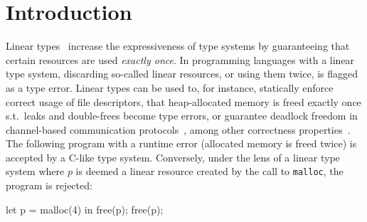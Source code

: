 \documentclass[acmsmall,review,screen]{acmart}
\newcommand{\ROUNDTWO}[1]{{\color{red}#1}}
\begin{document}
\section{Introduction}\label{sec:intro}


Linear types~\cite{cite:linear-logic,cite:barberdill} increase the
expressiveness of type systems by \ROUNDTWO{guaranteeing that certain
resources} are used \emph{exactly once}.
%
In programming languages with a linear type system, \ROUNDTWO{discarding so-called linear} resources,
or using them twice, is flagged as a type error. Linear types can \ROUNDTWO{be used to}, for instance,
statically enforce correct usage of file descriptors, that heap-allocated
memory is freed exactly once \ROUNDTWO{s.t.}~leaks and double-frees become type errors,
or guarantee deadlock freedom in channel-based communication protocols~\cite{10.1007/978-3-642-15375-4_16},
among other correctness properties~\cite{10.1145/3373718.3394765,10.1145/3527313,cite:linearhaskell}.
%
The following program with a runtime error (allocated memory is freed twice) is
accepted by a C-like type system. Conversely, under the lens of a linear type
system where $p$ is deemed a linear resource created by the call to
\texttt{malloc}, the program is rejected:
\begin{code}
let p = malloc(4) in free(p); free(p);
\end{code}
\end{document}

